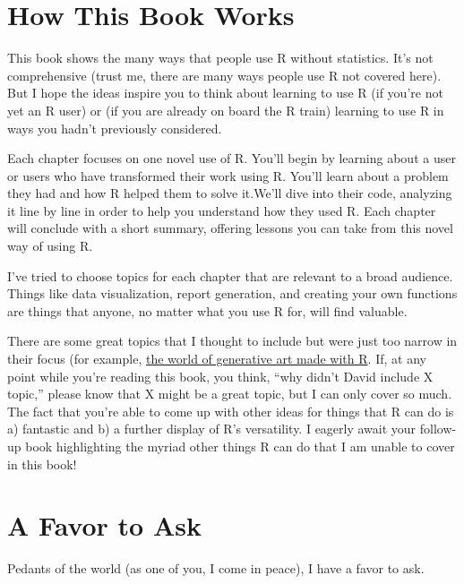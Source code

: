 \documentclass[
]{book}
\begin{document}
\hypertarget{how-this-book-works}{%
\section*{How This Book Works}\label{how-this-book-works}}

This book shows the many ways that people use R without statistics. It's not comprehensive (trust me, there are many ways people use R not covered here). But I hope the ideas inspire you to think about learning to use R (if you're not yet an R user) or (if you are already on board the R train) learning to use R in ways you hadn't previously considered.

Each chapter focuses on one novel use of R. You'll begin by learning about a user or users who have transformed their work using R. You'll learn about a problem they had and how R helped them to solve it.We'll dive into their code, analyzing it line by line in order to help you understand how they used R. Each chapter will conclude with a short summary, offering lessons you can take from this novel way of using R.

I've tried to choose topics for each chapter that are relevant to a broad audience. Things like data visualization, report generation, and creating your own functions are things that anyone, no matter what you use R for, will find valuable.

There are some great topics that I thought to include but were just too narrow in their focus (for example, \href{https://blog.djnavarro.net/posts/2021-10-19_rtistry-posts/}{the world of generative art made with R}. If, at any point while you're reading this book, you think, ``why didn't David include X topic,'' please know that X might be a great topic, but I can only cover so much. The fact that you're able to come up with other ideas for things that R can do is a) fantastic and b) a further display of R's versatility. I eagerly await your follow-up book highlighting the myriad other things R can do that I am unable to cover in this book!

\hypertarget{a-favor-to-ask}{%
\section*{A Favor to Ask}\label{a-favor-to-ask}}

Pedants of the world (as one of you, I come in peace), I have a favor to ask.
\end{document}
